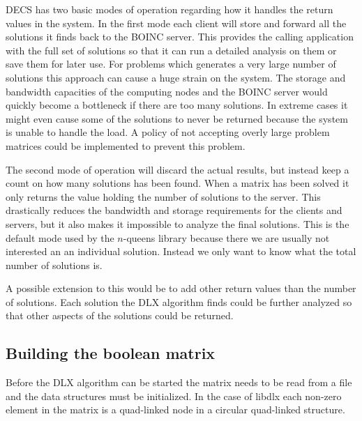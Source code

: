 DECS has two basic modes of operation regarding how it handles the return values in the system.
In the first mode each client will store and forward all the solutions it finds back to the BOINC server.
This provides the calling application with the full set of solutions so that it can run a detailed analysis on them or save them for later use.
For problems which generates a very large number of solutions this approach can cause a huge strain on the system.
The storage and bandwidth capacities of the computing nodes and the BOINC server would quickly become a bottleneck if there are too many solutions.
In extreme cases it might even cause some of the solutions to never be returned because the system is unable to handle the load.
A policy of not accepting overly large problem matrices could be implemented to prevent this problem.

The second mode of operation will discard the actual results, but instead keep a count on how many solutions has been found.
When a matrix has been solved it only returns the value holding the number of solutions to the server.
This drastically reduces the bandwidth and storage requirements for the clients and servers, but it also makes it impossible to analyze the final solutions.
This is the default mode used by the $n$-queens library because there we are usually not interested an an individual solution.
Instead we only want to know what the total number of solutions is.

A possible extension to this would be to add other return values than the number of solutions.
Each solution the DLX algorithm finds could be further analyzed so that other aspects of the solutions could be returned.



\subsection{Building the boolean matrix}
\label{matrix_construction}

Before the DLX algorithm can be started the matrix needs to be read from a file and the data structures must be initialized.
In the case of libdlx each non-zero element in the matrix is a quad-linked node in a circular quad-linked structure.


